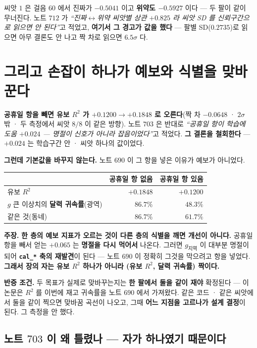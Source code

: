 \documentclass[10pt,a4paper]{article}
\newcommand{\claim}[2]{\begin{claimbox}\textbf{주장.} #1\par\smallskip
  \textcolor{gray!70}{\textbf{반증 조건.} #2}\end{claimbox}}
\begin{document}
씨앗 $1$ 은 걸음 $60$ 에서 진짜가 $-0.5041$ 이고 \textbf{위약도 $-0.5927$} 이다 ---
두 팔이 같이 무너진다. 노트 $712$ 가 \emph{``진짜$\leftrightarrow$위약 씨앗별 상관
$+0.825$ 라 씨앗 SD 를 신뢰구간으로 읽으면 안 된다''}고 적었고, \textbf{여기서 그
경고가 값을 했다} --- 팔별 SD($0.2735$)로 읽으면 아무 결론도 안 나고 짝 차로
읽으면 $6.5\sigma$ 다.

\section{그리고 손잡이 하나가 예보와 식별을 맞바꾼다}

\textbf{공휴일 항을 빼면 유보 $R^2$ 가 $+0.1200 \to +0.1848$ 로 오른다}(짝 차
$-0.0648$ · $2\sigma$ 밖 · 두 측정에서 씨앗 $8/8$ 이 같은 방향). 노트 $703$ 은
반대로 \emph{``공휴일 항이 학습에 도움 $+0.024$ --- 명절이 신호가 아니라
잡음이었다''}고 적었다. \textbf{그 결론을 철회한다} --- $+0.024$ 는 학습구간 안 ·
씨앗 하나의 값이었다.

\textbf{그런데 기본값을 바꾸지 않는다.} 노트 $690$ 이 그 항을 넣은 이유가
예보가 아니었다.

\begin{center}
\begin{tabular}{lrr}
\toprule
& 공휴일 항 없음 & 공휴일 항 있음 \\
\midrule
유보 $R^2$ & $\mathbf{+0.1848}$ & $+0.1200$ \\
$g$ 큰 이상치의 \textbf{달력 귀속률}(광역) & $86.7\%$ & $\mathbf{48.3\%}$ \\
같은 것(동네) & $86.7\%$ & $\mathbf{61.7\%}$ \\
\bottomrule
\end{tabular}
\end{center}

\claim{\textbf{한 층의 예보 지표가 오르는 것이 다른 층의 식별을 깨면 개선이
아니다.} 공휴일 항을 빼서 얻는 $+0.065$ 는 \textbf{명절을 다시 먹어서} 나온다.
그러면 $g_{\text{지역}}$ 이 대부분 명절이 되어 \textbf{\texttt{cal\_*} 축의
재발견}이 된다 --- 노트 $690$ 이 정확히 그것을 막으려고 항을 넣었다. \textbf{그래서
장의 자는 유보 $R^2$ 하나가 아니라 (유보 $R^2$, 달력 귀속률) 짝이다.}}
{두 목표가 실제로 맞바꾸는지는 \textbf{한 팔에서 둘을 같이 재야} 확정된다 --- 이
논문은 $R^2$ 를 이번에 재고 귀속률을 노트 $690$ 에서 가져왔다. 같은 코드 · 같은
씨앗에서 둘을 같이 찍으면 맞바꿈 곡선이 나오고, 그때 \textbf{어느 지점을 고르나가
설계 결정}이 된다. 그 측정을 안 했다.}

\subsection*{노트 $703$ 이 왜 틀렸나 --- 자가 하나였기 때문이다}
\end{document}
